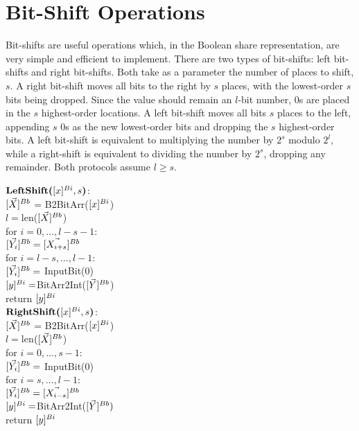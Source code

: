 \section{Bit-Shift Operations}

Bit-shifts are useful operations which, in the Boolean share representation,
are very simple and efficient to implement.
There are two types of bit-shifts: left bit-shifts and right bit-shifts.
Both take as a parameter the number of places to shift, $s$.
A right bit-shift moves all bits to the right by $s$ places,
with the lowest-order $s$ bits being dropped. 
Since the value should remain an $l$-bit number, 
0s are placed in the $s$ highest-order locations.
A left bit-shift moves all bits $s$ places to the left, 
appending $s$ 0s as the new lowest-order bits
and dropping the $s$ highest-order bits.
A left bit-shift is equivalent to multiplying the number by $2^s$
modulo $2^l$,
while a right-shift is equivalent to dividing the number by
$2^s$, dropping any remainder.
Both protocols assume $l \geq s$.

\begin{protocol}[BitShift]
	$\textbf{LeftShift(}[x]^{Bi}, s\textbf{)}$:\\
	\indent $[\vec{X}]^{Bb}$ = B2BitArr($[x]^{Bi}$)\\
	\indent $l = $len($[\vec{X}]^{Bb}$) \\
	\indent for $i = 0, \ldots, l-s-1$:\\
	\indent \indent $[\vec{Y_i}]^{Bb} = [\vec{X_{i+s}}]^{Bb}$ \\
	\indent for $i = l-s, \ldots, l-1$:\\
	\indent \indent $[\vec{Y_i}]^{Bb} =$ InputBit(0) \\
	\indent $[y]^{Bi} = $BitArr2Int($[\vec{Y}]^{Bb}$) \\
	\indent return $[y]^{Bi}$ \\

\noindent $\textbf{RightShift(}[x]^{Bi}, s\textbf{)}$:\\
	\indent $[\vec{X}]^{Bb}$ = B2BitArr($[x]^{Bi}$)\\
	\indent $l = $len$([\vec{X}]^{Bb}$) \\
	\indent for $i = 0, \ldots, s-1$: \\
	\indent \indent $[\vec{Y_i}]^{Bb} = $ InputBit(0) \\
	\indent for $i = s, \ldots, l-1$: \\
	\indent \indent $[\vec{Y_i}]^{Bb} = [\vec{X_{i-s}}]^{Bb}$ \\
	\indent $[y]^{Bi} = $BitArr2Int($[\vec{Y}]^{Bb})$ \\
	\indent return $[y]^{Bi}$
\end{protocol}




